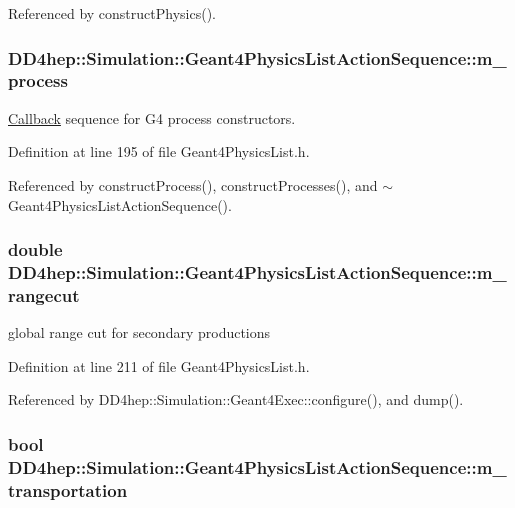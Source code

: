 Referenced by constructPhysics().\hypertarget{class_d_d4hep_1_1_simulation_1_1_geant4_physics_list_action_sequence_ae2f6d60bc1654668ee661e9010b5fa82}{
\subsubsection[{m\_\-process}]{ {\bf DD4hep::Simulation::Geant4PhysicsListActionSequence::m\_\-process}}}
\label{class_d_d4hep_1_1_simulation_1_1_geant4_physics_list_action_sequence_ae2f6d60bc1654668ee661e9010b5fa82}


\hyperlink{class_d_d4hep_1_1_callback}{Callback} sequence for G4 process constructors. 

Definition at line 195 of file Geant4PhysicsList.h.

Referenced by constructProcess(), constructProcesses(), and $\sim$Geant4PhysicsListActionSequence().\hypertarget{class_d_d4hep_1_1_simulation_1_1_geant4_physics_list_action_sequence_a125a5acaa8915ef45d5832351ce3a9df}{
\subsubsection[{m\_\-rangecut}]{\setlength{\rightskip}{0pt plus 5cm}double {\bf DD4hep::Simulation::Geant4PhysicsListActionSequence::m\_\-rangecut}}}
\label{class_d_d4hep_1_1_simulation_1_1_geant4_physics_list_action_sequence_a125a5acaa8915ef45d5832351ce3a9df}


global range cut for secondary productions 

Definition at line 211 of file Geant4PhysicsList.h.

Referenced by DD4hep::Simulation::Geant4Exec::configure(), and dump().\hypertarget{class_d_d4hep_1_1_simulation_1_1_geant4_physics_list_action_sequence_aa8940ea98233de519fa743f4cbf02381}{
\subsubsection[{m\_\-transportation}]{\setlength{\rightskip}{0pt plus 5cm}bool {\bf DD4hep::Simulation::Geant4PhysicsListActionSequence::m\_\-transportation}}}
\label{class_d_d4hep_1_1_simulation_1_1_geant4_physics_list_action_sequence_aa8940ea98233de519fa743f4cbf02381}


